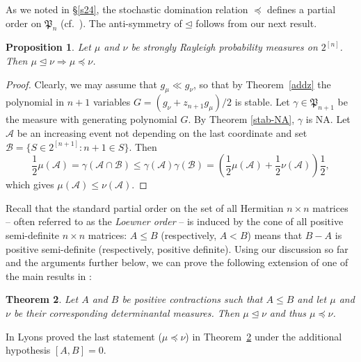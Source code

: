 \documentclass[10pt,reqno]{amsart}
\theoremstyle{plain}
\newtheorem{theorem}{Theorem}[section]
\newtheorem{proposition}[theorem]{Proposition}
\theoremstyle{definition}
\theoremstyle{remark}
\newcommand{\AS}{\mathcal{A}}
\newcommand{\BS}{\mathcal{B}}
\newcommand{\fP}{\mathfrak{P}}
\newcommand{\pc}{\preccurlyeq}
\begin{document}
As we noted in \S \ref{s24}, the stochastic domination relation $\pc$ defines
a partial order on $\fP_n$ (cf.~\cite{MO}). 
The anti-symmetry of $\unlhd$ follows from our next result. 

\begin{proposition}\label{stdom}
Let $\mu$ and $\nu$ be strongly Rayleigh probability measures on $2^{[n]}$. 
Then 
$\mu \unlhd \nu \Longrightarrow \mu \pc \nu$.
\end{proposition}

\begin{proof}
Clearly, we may assume that $g_\mu \ll g_\nu$, 
so that by Theorem~\ref{addz} the
polynomial in $n+1$ variables 
$G=(g_\nu +z_{n+1}g_\mu)/2$ is stable. Let $\gamma\in\fP_{n+1}$ be the 
measure with generating polynomial $G$. By 
Theorem \ref{stab-NA}, $\gamma$ is NA. Let $\AS$ be an 
increasing event not depending on the last coordinate  and 
set $\BS=\{ S  \in 2^{[n+1]} : n+1 \in S \}$. Then 
$$
\frac{1}{2} \mu(\AS) = \gamma(\AS \cap \BS) \leq \gamma(\AS) 
\gamma(\BS)
= \left(\frac{1}{2} \mu(\AS) + \frac{1}{2} \nu(\AS)\right)\frac{1}{2}, 
$$
which gives $\mu(\AS) \leq \nu(\AS)$. 
\end{proof}

Recall that the standard partial order on the set of all Hermitian $n\times n$
matrices -- often referred to as the {\em Loewner order} \cite{MO} -- is
induced by the cone of all positive semi-definite $n\times n$ matrices: 
$A\le B$ 
(respectively, $A<B$) means that $B-A$ is positive semi-definite (respectively,
positive definite). Using our discussion so far and the arguments further 
below, we can prove the following extension of one of the main results in 
\cite{Lyons}: 

\begin{theorem}\label{th-lyo}
Let $A$ and $B$ be positive contractions such that $A \leq B$ and let 
$\mu$ and $\nu$ be their corresponding determinantal measures. Then 
$\mu \unlhd \nu$ and thus $\mu\pc \nu$. 
\end{theorem}

In \cite[Theorem 8.1]{Lyons} Lyons 
proved the last statement ($\mu\pc \nu$) in Theorem~\ref{th-lyo} under 
the additional hypothesis $[A,B]=0$. 
\end{document}
